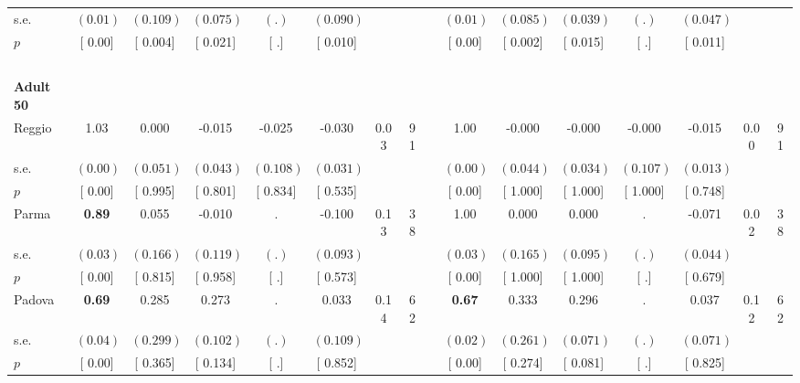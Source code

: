 \begin{longtable}{L{8em} c c c c c c c p{1em} c c c c c c c}
\quad \quad \quad \quad s.e.& $ (     0.01)$ & $ (    0.109)$ & $ (    0.075)$ & $ (        .)$ & $ (    0.090)$ & & & & $ (     0.01)$ & $ (    0.085)$ & $ (    0.039)$ & $ (        .)$ & $ (    0.047)$ & &  \\*
\quad \quad \quad \quad $ p$ & [     0.00] & [    0.004] & [    0.021] & [        .] & [    0.010] & & & & [     0.00] & [    0.002] & [    0.015] & [        .] & [    0.011] & &  \\[1em]
~\\[1em]
\quad \quad \textbf{Adult 50} & & & & & & & & & & & & & & & \\* 
\quad \quad \quad Reggio& 1.03 &     0.000 &    -0.015 &    -0.025 &    -0.030 &      0.03 &        91 & & 1.00 &    -0.000 &    -0.000 &    -0.000 &    -0.015 &      0.00 &        91  \\*
\quad \quad \quad \quad s.e.& $ (     0.00)$ & $ (    0.051)$ & $ (    0.043)$ & $ (    0.108)$ & $ (    0.031)$ & & & & $ (     0.00)$ & $ (    0.044)$ & $ (    0.034)$ & $ (    0.107)$ & $ (    0.013)$ & &  \\*
\quad \quad \quad \quad $ p$ & [     0.00] & [    0.995] & [    0.801] & [    0.834] & [    0.535] & & & & [     0.00] & [    1.000] & [    1.000] & [    1.000] & [    0.748] & &  \\[1em]
\quad \quad \quad Parma& \textbf{     0.89} &     0.055 &    -0.010 &         . &    -0.100 &      0.13 &        38 & & 1.00 &     0.000 &     0.000 &         . &    -0.071 &      0.02 &        38  \\*
\quad \quad \quad \quad s.e.& $ (     0.03)$ & $ (    0.166)$ & $ (    0.119)$ & $ (        .)$ & $ (    0.093)$ & & & & $ (     0.03)$ & $ (    0.165)$ & $ (    0.095)$ & $ (        .)$ & $ (    0.044)$ & &  \\*
\quad \quad \quad \quad $ p$ & [     0.00] & [    0.815] & [    0.958] & [        .] & [    0.573] & & & & [     0.00] & [    1.000] & [    1.000] & [        .] & [    0.679] & &  \\[1em]
\quad \quad \quad Padova& \textbf{     0.69} &     0.285 &     0.273 &         . &     0.033 &      0.14 &        62 & & \textbf{     0.67} &     0.333 & $ \mathbf{    0.296}$ &         . &     0.037 &      0.12 &        62  \\*
\quad \quad \quad \quad s.e.& $ (     0.04)$ & $ (    0.299)$ & $ (    0.102)$ & $ (        .)$ & $ (    0.109)$ & & & & $ (     0.02)$ & $ (    0.261)$ & $ (    0.071)$ & $ (        .)$ & $ (    0.071)$ & &  \\*
\quad \quad \quad \quad $ p$ & [     0.00] & [    0.365] & [    0.134] & [        .] & [    0.852] & & & & [     0.00] & [    0.274] & [    0.081] & [        .] & [    0.825] & &  \\[1em]

\end{longtable}
